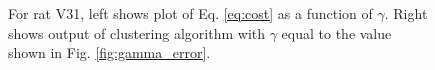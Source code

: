 \documentclass[superscriptaddress, twocolumn, prl]{revtex4}
\begin{document}
\begin{figure}
\centering
{}
\caption{For rat V31, left shows plot of Eq. \ref{eq:cost} as a function of $\gamma$. Right shows output of clustering algorithm with $\gamma$ equal to the value shown in Fig. \ref{fig:gamma_error}.}
\end{figure}
\end{document}
